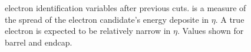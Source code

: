  \begin{figure}[htb]
  \begin{center}
  \end{center}
    \caption[\sieie electron identification variables after previous cuts]{
      \sieie electron identification variables after previous cuts.  
      \sieie is a measure of the spread of the electron candidate's energy deposite in $\eta$.  
      A true electron is expected to be relatively narrow in $\eta$.  
      Values shown for  barrel and 
       endcap.
    }
  \label{fig:sieieElecIdVars}
 \end{figure}



